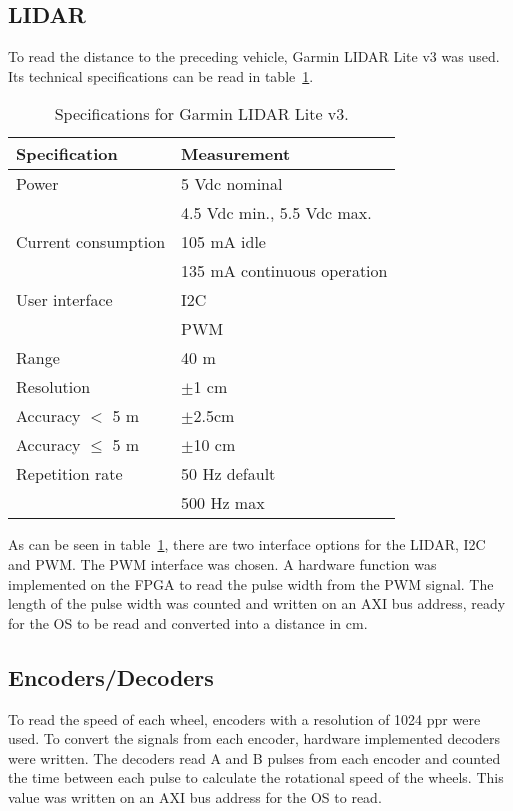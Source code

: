 \subsection{LIDAR}
To read the distance to the preceding vehicle, Garmin LIDAR Lite v3 was used. Its technical specifications can be read in table~\ref{table:lidar}.

\begin{table}[H]
\centering
\begin{tabular}{|l|l|}
\hline
\textbf{Specification} & \textbf{Measurement}\\ \hline
Power & 5 Vdc nominal\\
 & 4.5 Vdc min., 5.5 Vdc max.\\ \hline
Current consumption & 105 mA idle\\
 & 135 mA continuous operation\\ \hline
User interface & I2C\\
 & PWM\\ \hline
Range & 40 m\\ \hline
Resolution & $\pm$1 cm\\ \hline
Accuracy $<$ 5 m & $\pm$2.5cm\\ \hline
Accuracy $\leq$ 5 m & $\pm$10 cm\\ \hline
Repetition rate & 50 Hz default\\
 & 500 Hz max\\ \hline
\end{tabular}
\caption{Specifications for Garmin LIDAR Lite v3.}
\label{table:lidar}
\end{table}

As can be seen in table~\ref{table:lidar}, there are two interface options for the LIDAR, I2C and PWM. The PWM interface was chosen. A hardware function was implemented on the FPGA to read the pulse width from the PWM signal. The length of the pulse width was counted and written on an AXI bus address, ready for the OS to be read and converted into a distance in cm. %

\subsection{Encoders/Decoders}
To read the speed of each wheel, encoders with a resolution of 1024 ppr were used. To convert the signals from each encoder, hardware implemented decoders were written. The decoders read A and B pulses from each encoder and counted the time between each pulse to calculate the rotational speed of the wheels. This value was written on an AXI bus address for the OS to read. %

